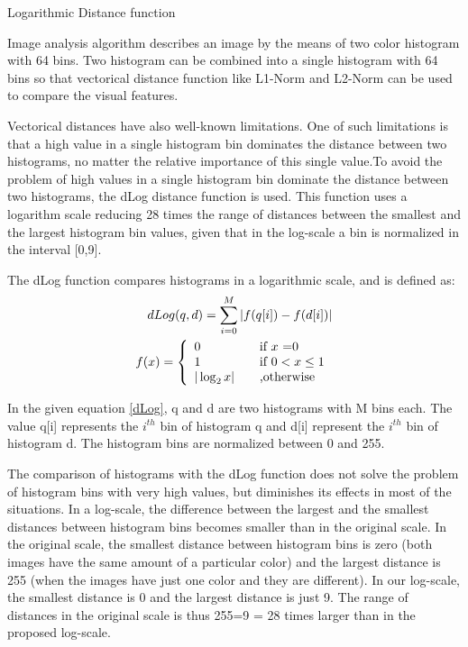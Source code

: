  

 

Logarithmic Distance function

Image analysis algorithm describes an image by the means of two color histogram with 64 bins. Two histogram can be combined into a single histogram with 64 bins so that vectorical distance function like L1-Norm and L2-Norm can be used to compare the visual features.

Vectorical distances have also well-known limitations. One of such limitations is that a high value in a single histogram bin dominates the distance between two histograms, no matter the relative importance of this single value.To avoid the problem of high values in a single histogram bin dominate the distance between two histograms, the dLog distance function is used. This function uses a logarithm scale reducing 28 times the range of distances between the smallest and the largest histogram bin values, given that in the log-scale a bin is normalized in the interval [0,9].

The dLog function compares histograms in a logarithmic scale, and is defined as:
\begin{align}
dLog(q,d) = \sum_{i=0}^M |f(q[i])- f(d[i])|\label{dLog}   \\
f(x)= \left\{ 
\begin{array}{l l}
  0 & \quad \mbox{if $x$ =0}\\
  1 & \quad \text {if } 0< x \le 1\\ 
  |\log_{2}{x}| & \quad \text{,otherwise} \\
\end{array} \right.
\end{align}

In the given equation \ref{dLog}, q and d are two histograms with M bins each. The value q[i] represents the $ i^{th}$ bin of histogram q and d[i] represent the $i^{th}$ bin of histogram d. The histogram bins are normalized between 0 and 255.

 

The comparison of histograms with the dLog function does not solve the problem of histogram bins with very high values, but diminishes its effects in most of the situations. In a log-scale, the difference between the largest and the smallest distances between histogram bins becomes smaller than in the original scale. In the original scale, the smallest distance between histogram bins is zero (both images have the same amount of a particular color) and the largest distance is 255 (when the images have just one color and they are different). In our log-scale, the smallest distance is 0 and the largest distance is just 9. The range of distances in the original scale is thus 255=9 = 28 times larger than in the proposed log-scale.

